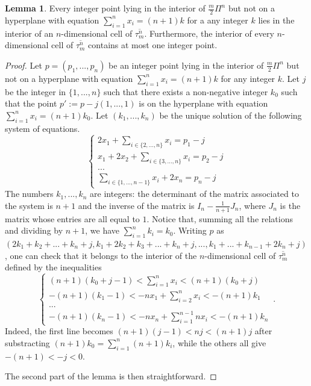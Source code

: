 \documentclass[12pt]{article}
\theoremstyle{definition}
\newtheorem{lem}{Lemma}[section]
\begin{document}
\begin{lem}
    \label{lemma_points_in_cells}
    Every integer point lying in the interior of $\frac{m}{2}\Pi^n$ but not on a hyperplane with equation $\sum_{i=1}^n x_i = (n+1)k$ for a any integer $k$ lies in the interior of an $n$-dimensional cell of $\overline{\tau_m^n}$. Furthermore, the interior of every $n$-dimensional cell of $\overline{\tau_m^n}$ contains at most one integer point. 
\end{lem}

\begin{proof}
    Let $p = (p_1,..., p_n)$ be an integer point lying in the interior of $\frac{m}{2}\Pi^n$ but not on a hyperplane with equation $\sum_{i=1}^n x_i = (n+1)k$ for any integer $k$. Let $j$ be the integer in $\{1,...,n \}$ such that there exists a non-negative integer $k_0$ such that the point $p' := p - j(1,...,1)$ is on the hyperplane with equation $\sum_{i=1}^n x_i = (n+1)k_0$. Let $(k_1,...,k_n)$ be the unique solution of the following system of equations.
    \begin{equation}
    \begin{cases}
      2x_1 + \sum_{i \in \{2,...,n \}}x_i =  p_1 - j\\
      x_1 + 2x_2 + \sum_{i \in \{3,...,n \}}x_i = p_2 - j\\
      ...\\
      \sum_{i \in \{1,...,n-1\}}x_i + 2x_n = p_n-j
    \end{cases}
    \end{equation}
    The numbers $k_1,...,k_n$ are integers: the determinant of the matrix associated to the system is $n+1$ and the inverse of the matrix is $I_n - \frac{1}{n+1}J_n$, where $J_n$ is the matrix whose entries are all equal to $1$.
    Notice that, summing all the relations and dividing by $n+1$, we have $\sum_{i = 1}^n k_i = k_0$. Writing $p$ as $(2k_1 + k_2+...+k_n + j, k_1 + 2k_2 + k_3 + ... + k_n + j, ..., k_1 + ... + k_{n-1} + 2k_n + j)$, one can check that it belongs to the interior of the $n$-dimensional cell of $\overline{\tau_m^n}$ defined by the inequalities
    \begin{equation}
    \begin{cases}
        (n+1)(k_0 + j -1) < \sum_{i = 1}^n x_i < (n+1)(k_0 + j)\\
        -(n+1)(k_1-1) < -nx_1 + \sum_{i=2}^n x_i < -(n+1)k_1\\
        ...\\
        -(n+1)(k_n-1) < -nx_n + \sum_{i=1}^{n-1}n x_i < -(n+1)k_n
    \end{cases} \, .
    \end{equation}
    Indeed, the first line becomes $(n+1)(j-1) < nj < (n+1)j$ after substracting $(n+1)k_0 = \sum_{i=1}^n (n+1)k_i$, while the others all give $-(n+1) < -j < 0$.

    The second part of the lemma is then straightforward.
\end{proof}
\end{document}
